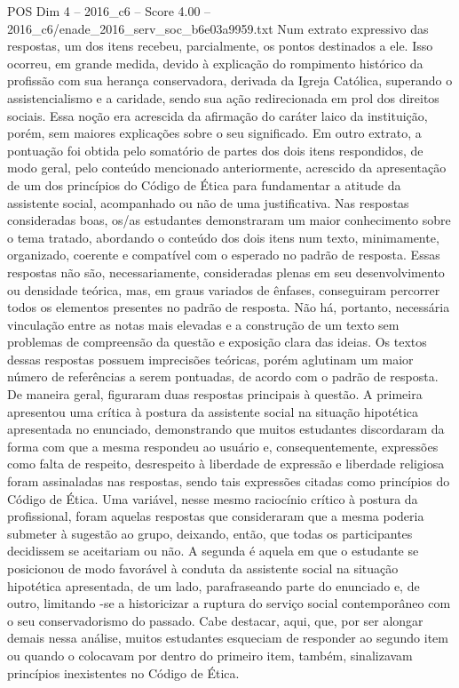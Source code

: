 \begin{textsample}{POS Dim 4 – 2016\_c6 – Score 4.00 – 2016\_c6/enade\_2016\_serv\_soc\_b6e03a9959.txt}
Num extrato expressivo das respostas, um dos itens recebeu, parcialmente, os pontos destinados a ele.
Isso ocorreu, em grande medida, devido à explicação do rompimento histórico da profissão com sua herança conservadora, derivada da Igreja Católica, superando o assistencialismo e a caridade, sendo sua ação redirecionada em prol dos direitos sociais.
Essa noção era acrescida da afirmação do caráter laico da instituição, porém, sem maiores explicações sobre o seu significado.
Em outro extrato, a pontuação foi obtida pelo somatório de partes dos dois itens respondidos, de modo geral, pelo conteúdo mencionado anteriormente, acrescido da apresentação de um dos princípios do Código de Ética para fundamentar a atitude da assistente social, acompanhado ou não de uma justificativa.
Nas respostas consideradas boas, os/as estudantes demonstraram um maior conhecimento sobre o tema tratado, abordando o conteúdo dos dois itens num texto, minimamente, organizado, coerente e compatível com o esperado no padrão de resposta.
Essas respostas não são, necessariamente, consideradas plenas em seu desenvolvimento ou densidade teórica, mas, em graus variados de ênfases, conseguiram percorrer todos os elementos presentes no padrão de resposta.
Não há, portanto, necessária vinculação entre as notas mais elevadas e a construção de um texto sem problemas de compreensão da questão e exposição clara das ideias.
Os textos dessas respostas possuem imprecisões teóricas, porém aglutinam um maior número de referências a serem pontuadas, de acordo com o padrão de resposta.
De maneira geral, figuraram duas respostas principais à questão.
A primeira apresentou uma crítica à postura da assistente social na situação hipotética apresentada no enunciado, demonstrando que muitos estudantes discordaram da forma com que a mesma respondeu ao usuário e, consequentemente, expressões como falta de respeito, desrespeito à liberdade de expressão e liberdade religiosa foram assinaladas nas respostas, sendo tais expressões citadas como princípios do Código de Ética.
Uma variável, nesse mesmo raciocínio crítico à postura da profissional, foram aquelas respostas que consideraram que a mesma poderia submeter à sugestão ao grupo, deixando, então, que todas os participantes decidissem se aceitariam ou não.
A segunda é aquela em que o estudante se posicionou de modo favorável à conduta da assistente social na situação hipotética apresentada, de um lado, parafraseando parte do enunciado e, de outro, limitando -se a historicizar a ruptura do serviço social contemporâneo com o seu conservadorismo do passado.
Cabe destacar, aqui, que, por ser alongar demais nessa análise, muitos estudantes esqueciam de responder ao segundo item ou quando o colocavam por dentro do primeiro item, também, sinalizavam princípios inexistentes no Código de Ética.

\end{textsample}
